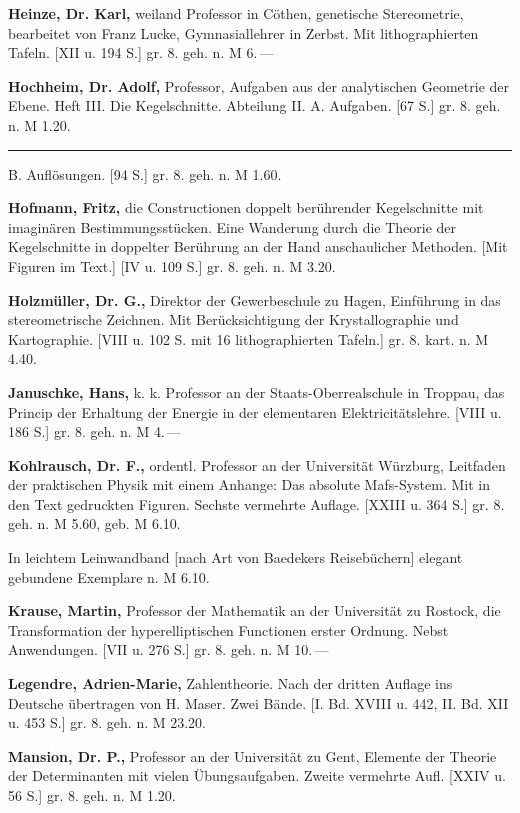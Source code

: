 \textbf{Heinze, Dr. Karl,} weiland Professor in Cöthen, genetische Stereometrie,
bearbeitet von Franz Lucke, Gymnasiallehrer in Zerbst. Mit lithographierten Tafeln.
[XII u. 194 S.] gr. 8. geh. n. M 6.\,---

\textbf{Hochheim, Dr. Adolf,} Professor, Aufgaben aus der analytischen Geometrie der
Ebene. Heft III. Die Kegelschnitte. Abteilung II. A. Aufgaben. [67 S.] gr. 8. geh.
n. M 1.20.

\rule{1.5em}{0.4pt} B. Auflösungen. [94 S.] gr. 8. geh. n. M 1.60.

\textbf{Hofmann, Fritz,} die Constructionen doppelt berührender Kegelschnitte mit
imaginären Bestimmungsstücken. Eine Wanderung durch die Theorie der Kegelschnitte in
doppelter Berührung an der Hand anschaulicher Methoden. [Mit Figuren im Text.]
[IV u. 109 S.] gr. 8. geh. n. M 3.20.

\textbf{Holzmüller, Dr. G.,} Direktor der Gewerbeschule zu Hagen, Einführung in das
stereometrische Zeichnen. Mit Berücksichtigung der Krystallographie und Kartographie.
[VIII u. 102 S. mit 16 lithographierten Tafeln.] gr. 8. kart. n. M 4.40.

\textbf{Januschke, Hans,} k. k. Professor an der Staats-Oberrealschule in Troppau,
das Princip der Erhaltung der Energie in der elementaren Elektricitätslehre.
[VIII u. 186 S.] gr. 8. geh. n. M 4.\,---

\textbf{Kohlrausch, Dr. F.,} ordentl. Professor an der Universität Würzburg, Leitfaden
der praktischen Physik mit einem Anhange: Das absolute Mafs-System. Mit in den Text
gedruckten Figuren. Sechste vermehrte Auflage. [XXIII u. 364 S.] gr. 8. geh. n. M
5.60, geb. M 6.10.

In leichtem Leinwandband [nach Art von Baedekers Reisebüchern] elegant gebundene
Exemplare n. M 6.10.

\textbf{Krause, Martin,} Professor der Mathematik an der Universität zu Rostock, die
Transformation der hyperelliptischen Functionen erster Ordnung. Nebst Anwendungen.
[VII u. 276 S.] gr. 8. geh. n. M 10.\,---

\textbf{Legendre, Adrien-Marie,} Zahlentheorie. Nach der dritten Auflage ins Deutsche
übertragen von H. Maser. Zwei Bände. [I. Bd. XVIII u. 442, II. Bd. XII u. 453 S.]
gr. 8. geh. n. M 23.20.

\textbf{Mansion, Dr. P.,} Professor an der Universität zu Gent, Elemente der Theorie
der Determinanten mit vielen Übungsaufgaben. Zweite vermehrte Aufl. [XXIV u. 56 S.]
gr. 8. geh. n. M 1.20.

